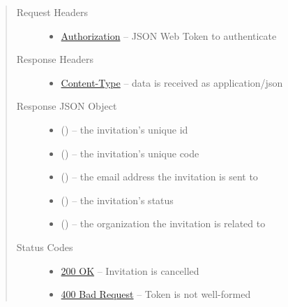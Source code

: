 \documentclass[letterpaper,10pt,english]{sphinxmanual}
\begin{document}
\begin{fulllineitems}
\begin{quote}
\begin{description}
\begin{itemize}
\end{itemize}

\item[{Request Headers}] \leavevmode\begin{itemize}
\item {} 
\href{http://tools.ietf.org/html/rfc7235\#section-4.2}{Authorization} -- JSON Web Token to authenticate

\end{itemize}

\item[{Response Headers}] \leavevmode\begin{itemize}
\item {} 
\href{http://tools.ietf.org/html/rfc7231\#section-3.1.1.5}{Content-Type} -- data is received as application/json

\end{itemize}

\item[{Response JSON Object}] \leavevmode\begin{itemize}
\item {} 
 () -- the invitation's unique id

\item {} 
 () -- the invitation's unique code

\item {} 
 () -- the email address the invitation is sent to

\item {} 
 () -- the invitation's status

\item {} 
 () -- the organization the invitation is related
to

\end{itemize}

\item[{Status Codes}] \leavevmode\begin{itemize}
\item {} 
\href{http://www.w3.org/Protocols/rfc2616/rfc2616-sec10.html\#sec10.2.1}{200 OK} -- Invitation is cancelled

\item {} 
\href{http://www.w3.org/Protocols/rfc2616/rfc2616-sec10.html\#sec10.4.1}{400 Bad Request} -- Token is not well-formed


\end{itemize}
\end{description}
\end{quote}
\end{fulllineitems}
\end{document}
